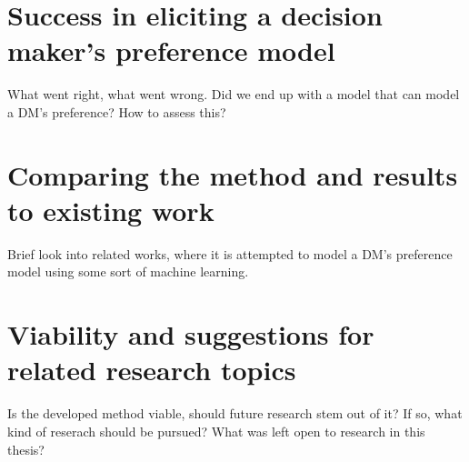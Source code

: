 \section{Success in eliciting a decision maker's preference model}
{\color{red}
What went right, what went wrong. Did we end up with a model that can model a DM's preference? How to assess this?
}

\section{Comparing the method and results to existing work}
{\color{red}
Brief look into related works, where it is attempted to model a DM's preference model using some sort of machine learning.
}

\section{Viability and suggestions for related research topics}
{\color{red}
Is the developed method viable, should future research stem out of it? If so, what kind of reserach should be pursued? What was left open to research in this
thesis?
}